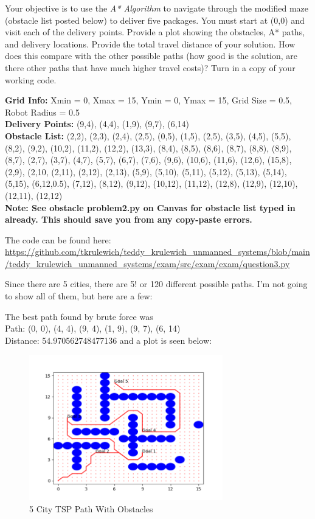 \documentclass{article}
\begin{document}
Your objective is to use the \textit{A* Algorithm} to navigate through the modified maze (obstacle list posted
below) to deliver five packages. You must start at (0,0) and visit each of the delivery points. Provide a
plot showing the obstacles, A* paths, and delivery locations. Provide the total travel distance of your
solution. How does this compare with the other possible paths (how good is the solution, are there other
paths that have much higher travel costs)? Turn in a copy of your working code.

\pagebreak
\bigskip
\noindent\textbf{Grid Info:} Xmin = 0, Xmax = 15, Ymin = 0, Ymax = 15, Grid Size = 0.5, Robot Radius = 0.5 \\
\textbf{Delivery Points:} (9,4), (4,4), (1,9), (9,7), (6,14) \\
\textbf{Obstacle List:} (2,2), (2,3), (2,4), (2,5), (0,5), (1,5), (2,5), (3,5), (4,5), (5,5), (8,2), (9,2), (10,2), (11,2),
(12,2), (13,3), (8,4), (8,5), (8,6), (8,7), (8,8), (8,9), (8,7), (2,7), (3,7), (4,7), (5,7), (6,7), (7,6), (9,6),
(10,6), (11,6), (12,6), (15,8), (2,9), (2,10, (2,11), (2,12), (2,13), (5,9), (5,10), (5,11), (5,12), (5,13),
(5,14), (5,15), (6,12,0.5), (7,12), (8,12), (9,12), (10,12), (11,12), (12,8), (12,9), (12,10), (12,11), (12,12) \\

\noindent \textbf{Note: See obstacle problem2.py on Canvas for obstacle list typed in already. This should
save you from any copy-paste errors.}

\bigskip
\noindent The code can be found here: \\
\url{https://github.com/tkrulewich/teddy_krulewich_unmanned_systems/blob/main/teddy_krulewich_unmanned_systems/exam/src/exam/exam/question3.py}

\bigskip
\noindent Since there are 5 cities, there are 5! or 120 different possible paths. I'm not going to show all of them, but here are a few:


\bigskip
\noindent The best path found by brute force was \\
Path: (0, 0), (4, 4), (9, 4), (1, 9), (9, 7), (6, 14) \\
Distance: 54.970562748477136 and a plot is seen below:

\begin{figure}[H]
\centering
\includegraphics[width=0.75\textwidth]{images/question3.png}
\caption*{5 City TSP Path With Obstacles}
\end{figure}
\end{document}
